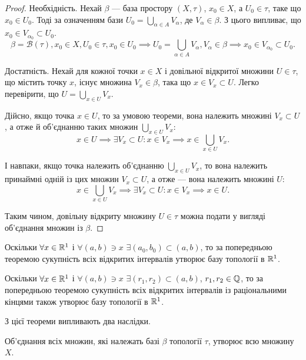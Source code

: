 \begin{proof}
Необхідність. Нехай $\beta$ --- база простору
$(X, \tau)$, $x_0 \in X$, а $U_0 \in \tau$, таке що $x_0 \in U_0$. Тоді за означенням бази $U_0 = \bigcup_{\alpha \in A} V_\alpha$, де $V_\alpha \in \beta$. З цього випливає, що $x_0 \in V_{\alpha_0} \subset U_0$.
\begin{equation*}
\beta = \mathcal{B}(\tau), x_0 \in X, U_0 \in \tau, x_0 \in U_0 \implies U_0 = \bigcup_{\alpha \in A} V_\alpha, V_\alpha \in \beta \implies x_0 \in V_{\alpha_0} \subset U_0.
\end{equation*}

Достатність. Нехай для кожної точки $x \in X$ і довільної
відкритої множини $U \in \tau$, що містить точку $x$, існує множина
$V_x \in \beta$, така що $x \in V_x \subset U$. Легко перевірити, що $U = \bigcup_{x \in U} V_x$.

Дійсно, якщо точка $x \in U$, то за умовою теореми, вона
належить множині $V_x \subset U$, а отже й об'єднанню таких
множин $\bigcup_{x \in U} V_x$: \[ x \in U \implies \exists V_x \subset U: x \in V_x \implies x \in \bigcup_{x \in U} V_x. \]

І навпаки, якщо точка належить об'єднанню $\bigcup_{x \in U} V_x$, то
вона належить принаймні одній із цих множин $V_x \subset U$, а
отже --- вона належить множині $U$: \[ x \in \bigcup_{x \in U} V_x \implies \exists V_x \subset U: x \in V_x \implies x \in U. \]

Таким чином, довільну відкриту множину $U \in \tau$ можна
подати у вигляді об'єд\-нання множин із $\beta$.
\end{proof}

\begin{example}
Оскільки $\forall x \in \mathbb{R}^1$ і $\forall (a, b) \ni x$ $\exists(a_0, b_0) \subset (a, b)$,
то за попередньою теоремою сукупність всіх відкритих інтервалів
утворює базу топології в $\mathbb{R}^1$.
\end{example}

\begin{example}
Оскільки $\forall x \in \mathbb{R}^1$ і $\forall (a, b) \ni x$ $\exists (r_1, r_2) \subset (a, b)$, $r_1, r_2 \in \mathbb{Q}$, то за попередньою теоремою сукупність всіх відкритих
інтервалів із раціональними кінцями також утворює базу
топології в $\mathbb{R}^1$.
\end{example}

З цієї теореми випливають два наслідки.

\begin{corollary}
Об'єднання всіх множин, які належать
базі $\beta$ топології $\tau$, утворює всю множину $X$.
\end{corollary}

